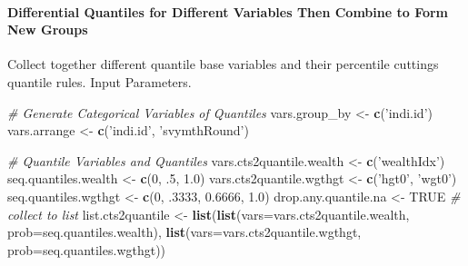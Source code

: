 \documentclass[
]{article}
\newenvironment{Shaded}{\begin{snugshade}}{\end{snugshade}}
\newcommand{\CommentTok}[1]{\textcolor[rgb]{0.56,0.35,0.01}{\textit{#1}}}
\newcommand{\DataTypeTok}[1]{\textcolor[rgb]{0.13,0.29,0.53}{#1}}
\newcommand{\DecValTok}[1]{\textcolor[rgb]{0.00,0.00,0.81}{#1}}
\newcommand{\FloatTok}[1]{\textcolor[rgb]{0.00,0.00,0.81}{#1}}
\newcommand{\KeywordTok}[1]{\textcolor[rgb]{0.13,0.29,0.53}{\textbf{#1}}}
\newcommand{\NormalTok}[1]{#1}
\newcommand{\OtherTok}[1]{\textcolor[rgb]{0.56,0.35,0.01}{#1}}
\newcommand{\StringTok}[1]{\textcolor[rgb]{0.31,0.60,0.02}{#1}}
\begin{document}
\hypertarget{differential-quantiles-for-different-variables-then-combine-to-form-new-groups}{%
\paragraph{Differential Quantiles for Different Variables Then Combine
to Form New
Groups}\label{differential-quantiles-for-different-variables-then-combine-to-form-new-groups}}

Collect together different quantile base variables and their percentile
cuttings quantile rules. Input Parameters.

\begin{Shaded}
\begin{Highlighting}[]
\CommentTok{# Generate Categorical Variables of Quantiles}
\NormalTok{vars.group_by <-}\StringTok{ }\KeywordTok{c}\NormalTok{(}\StringTok{'indi.id'}\NormalTok{)}
\NormalTok{vars.arrange <-}\StringTok{ }\KeywordTok{c}\NormalTok{(}\StringTok{'indi.id'}\NormalTok{, }\StringTok{'svymthRound'}\NormalTok{)}
\end{Highlighting}
\end{Shaded}

\begin{Shaded}
\begin{Highlighting}[]
\CommentTok{# Quantile Variables and Quantiles}
\NormalTok{vars.cts2quantile.wealth <-}\StringTok{ }\KeywordTok{c}\NormalTok{(}\StringTok{'wealthIdx'}\NormalTok{)}
\NormalTok{seq.quantiles.wealth <-}\StringTok{ }\KeywordTok{c}\NormalTok{(}\DecValTok{0}\NormalTok{, }\FloatTok{.5}\NormalTok{, }\FloatTok{1.0}\NormalTok{)}
\NormalTok{vars.cts2quantile.wgthgt <-}\StringTok{ }\KeywordTok{c}\NormalTok{(}\StringTok{'hgt0'}\NormalTok{, }\StringTok{'wgt0'}\NormalTok{)}
\NormalTok{seq.quantiles.wgthgt <-}\StringTok{ }\KeywordTok{c}\NormalTok{(}\DecValTok{0}\NormalTok{, }\FloatTok{.3333}\NormalTok{, }\FloatTok{0.6666}\NormalTok{, }\FloatTok{1.0}\NormalTok{)}
\NormalTok{drop.any.quantile.na <-}\StringTok{ }\OtherTok{TRUE}
\CommentTok{# collect to list}
\NormalTok{list.cts2quantile <-}\StringTok{ }\KeywordTok{list}\NormalTok{(}\KeywordTok{list}\NormalTok{(}\DataTypeTok{vars=}\NormalTok{vars.cts2quantile.wealth,}
                               \DataTypeTok{prob=}\NormalTok{seq.quantiles.wealth),}
                          \KeywordTok{list}\NormalTok{(}\DataTypeTok{vars=}\NormalTok{vars.cts2quantile.wgthgt,}
                               \DataTypeTok{prob=}\NormalTok{seq.quantiles.wgthgt))}
\end{Highlighting}
\end{Shaded}
\end{document}
